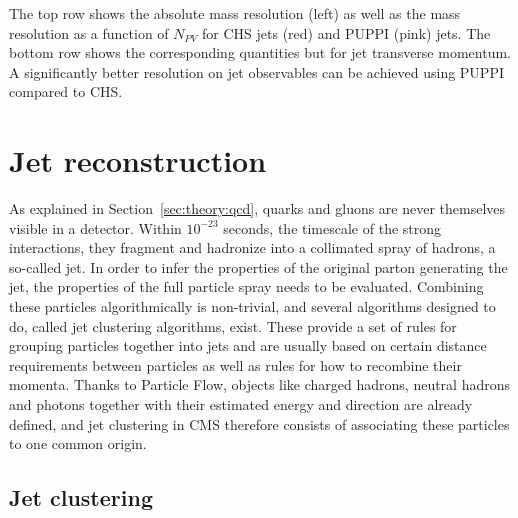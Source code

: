 The top row shows the absolute mass resolution (left) as well as the mass resolution as a function of $N_{PV}$ for CHS jets (red) and PUPPI (pink) jets. The bottom row shows the corresponding quantities but for jet transverse momentum. A significantly better resolution on jet observables can be achieved using PUPPI compared to CHS.



\section{Jet reconstruction}
As explained in Section~\ref{sec:theory:qcd}, quarks and gluons are never themselves visible in a detector. Within $10^{-23}$ seconds, the timescale of the strong interactions, they fragment and hadronize into a collimated spray of hadrons, a so-called jet. In order to infer the properties of the original parton generating the jet, the properties of the full particle spray needs to be evaluated.
Combining these particles algorithmically is non-trivial, and several algorithms designed to do, called jet clustering algorithms, exist.
These provide a set of rules for grouping particles together into jets and are usually based on certain distance requirements between particles as well as rules for how to recombine their momenta.
Thanks to Particle Flow, objects like charged hadrons, neutral hadrons and photons together with their estimated energy and direction are already defined, and jet clustering in CMS therefore consists of
associating these particles to one common origin.


\subsection{Jet clustering}

